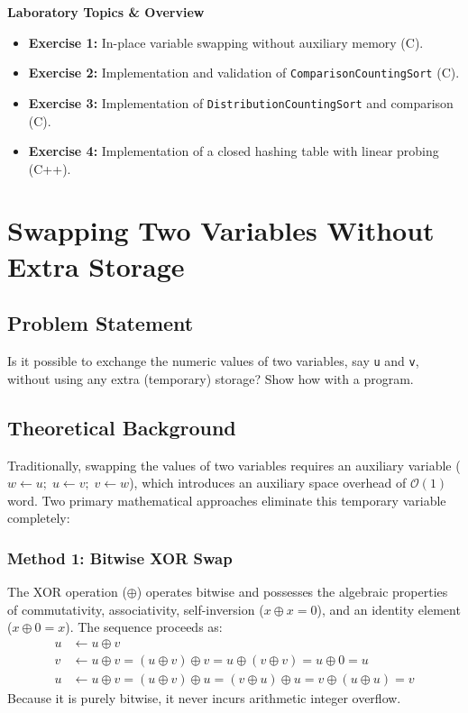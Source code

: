\documentclass[12pt,a4paper]{article}
\theoremstyle{plain}
\theoremstyle{definition}
\theoremstyle{remark}
\begin{document}
\begin{infobox}
  \textbf{\color{primary}\large Laboratory Topics \& Overview}
  \vspace{0.4em}
  \begin{itemize}[leftmargin=1.5em]
    \item \textbf{Exercise 1:} In-place variable swapping without auxiliary memory (C).
    \item \textbf{Exercise 2:} Implementation and validation of \texttt{ComparisonCountingSort} (C).
    \item \textbf{Exercise 3:} Implementation of \texttt{DistributionCountingSort} and comparison (C).
    \item \textbf{Exercise 4:} Implementation of a closed hashing table with linear probing (C++).
  \end{itemize}
\end{infobox}

\vspace{0.4cm}

\section{Swapping Two Variables Without Extra Storage}

\subsection{Problem Statement}
Is it possible to exchange the numeric values of two variables, say \texttt{u} and \texttt{v}, without using any extra (temporary) storage? Show how with a program.

\subsection{Theoretical Background}
Traditionally, swapping the values of two variables requires an auxiliary variable ($w \leftarrow u;\; u \leftarrow v;\; v \leftarrow w$), which introduces an auxiliary space overhead of $\mathcal{O}(1)$ word. Two primary mathematical approaches eliminate this temporary variable completely:

\subsubsection*{Method 1: Bitwise XOR Swap}
The XOR operation ($\oplus$) operates bitwise and possesses the algebraic properties of commutativity, associativity, self-inversion ($x \oplus x = 0$), and an identity element ($x \oplus 0 = x$). The sequence proceeds as:
\begin{align*}
  u &\leftarrow u \oplus v \\
  v &\leftarrow u \oplus v = (u \oplus v) \oplus v = u \oplus (v \oplus v) = u \oplus 0 = u \\
  u &\leftarrow u \oplus v = (u \oplus v) \oplus u = (v \oplus u) \oplus u = v \oplus (u \oplus u) = v
\end{align*}
Because it is purely bitwise, it never incurs arithmetic integer overflow.
\end{document}
